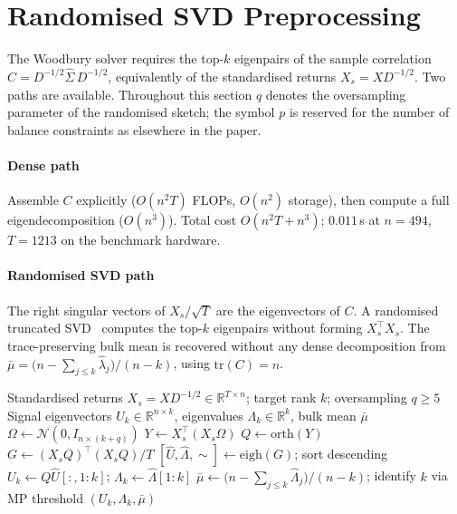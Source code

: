 \section{Randomised SVD Preprocessing}\label{sec:preprocessing}

The Woodbury solver requires the top-$k$ eigenpairs of the sample correlation
$C = D^{-1/2}\hat\Sigma\,D^{-1/2}$, equivalently of the standardised returns
$X_s = X D^{-1/2}$. Two paths are available. Throughout this section $q$ denotes
the oversampling parameter of the randomised sketch; the symbol $p$ is reserved
for the number of balance constraints as elsewhere in the paper.

\paragraph{Dense path}
Assemble $C$ explicitly ($O(n^2 T)$ FLOPs, $O(n^2)$ storage), then compute a full
eigendecomposition ($O(n^3)$). Total cost $O(n^2 T + n^3)$; $0.011$\,s at $n = 494$, $T = 1213$ on the benchmark
hardware.

\paragraph{Randomised SVD path}
The right singular vectors of $X_s/\sqrt{T}$ are the eigenvectors of $C$. A
randomised truncated SVD~\cite{halko2011} computes the top-$k$ eigenpairs without
forming $X_s^\top X_s$. The trace-preserving bulk mean is recovered without any
dense decomposition from
$\bar\mu = \bigl(n - \sum_{j\le k}\hat\lambda_j\bigr)/(n-k)$, using
$\mathrm{tr}(C) = n$.

\begin{algorithm}[ht]
\caption{Randomised truncated SVD for eigenpairs of the correlation $C$}\label{alg:rsvd}
\begin{algorithmic}[1]
\Require Standardised returns $X_s = X D^{-1/2} \in \mathbb{R}^{T \times n}$; target rank $k$; oversampling $q \geq 5$
\Ensure  Signal eigenvectors $U_k \in \mathbb{R}^{n \times k}$,
         eigenvalues $\Lambda_k \in \mathbb{R}^k$, bulk mean $\bar\mu$
\State $\Omega \leftarrow \mathcal{N}(0, I_{n \times (k+q)})$ 
\State $Y \leftarrow X_s^\top(X_s \Omega)$ 
\State $Q \leftarrow \mathrm{orth}(Y)$ 
\State $G \leftarrow (X_s Q)^\top(X_s Q) / T$ 
\State $[\hat U, \hat\Lambda, \sim] \leftarrow \mathrm{eigh}(G)$; sort descending
\State $U_k \leftarrow Q \hat U[:, 1{:}k]$; $\Lambda_k \leftarrow \hat\Lambda[1{:}k]$
\State $\bar\mu \leftarrow \bigl(n - \textstyle\sum_{j\le k}\hat\Lambda_j\bigr)/(n-k)$; identify $k$ via MP threshold
\State \Return $(U_k, \Lambda_k, \bar\mu)$
\end{algorithmic}
\end{algorithm}

